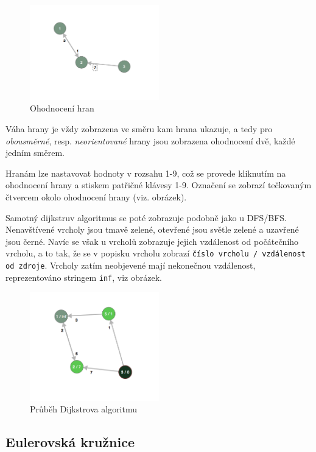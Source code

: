 \documentclass{article}
\def\code#1{\texttt{#1}}
\begin{document}
\begin{figure}
  \centering
    \includegraphics[width=0.5\textwidth]{2d7DzOA.png}
  \caption{Ohodnocení hran}
\end{figure}

Váha hrany je vždy zobrazena ve směru kam hrana ukazuje, a tedy pro
\emph{obousměrné}, resp. \emph{neorientované} hrany jsou zobrazena ohodnocení dvě,
každé jedním směrem.

Hranám lze nastavovat hodnoty v rozsahu 1-9, což se provede kliknutím na
ohodnocení hrany a stiskem patřičné klávesy 1-9. Označení se zobrazí
tečkovaným čtvercem okolo ohodnocení hrany (viz. obrázek).

Samotný dijkstruv algoritmus se poté zobrazuje podobně jako u DFS/BFS.
Nenavštívené vrcholy jsou tmavě zelené, otevřené jsou světle zelené a
uzavřené jsou černé. Navíc se však u vrcholů zobrazuje jejich vzdálenost
od počátečního vrcholu, a to tak, že se v popisku vrcholu zobrazí \code{číslo
vrcholu / vzdálenost od zdroje}. Vrcholy zatím neobjevené mají
nekonečnou vzdálenost, reprezentováno stringem \code{inf}, viz obrázek.

\begin{figure}
  \centering
    \includegraphics[width=0.5\textwidth]{OWYHOQ7.png}
  \caption{Průběh Dijkstrova algoritmu}
\end{figure}

\subsection{Eulerovská kružnice}
\end{document}
